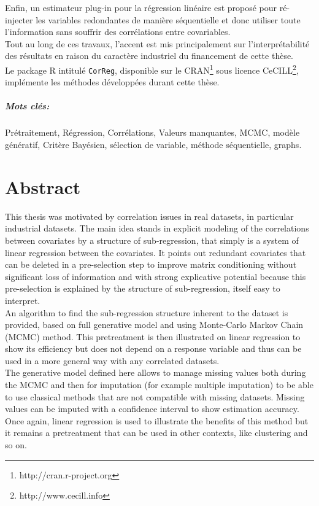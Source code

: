 \documentclass[12pt,a4paper]{report}
\begin{document}
	Enfin, un estimateur plug-in pour la régression linéaire est proposé pour ré-injecter les variables redondantes de manière séquentielle et donc utiliser toute l'information sans souffrir des corrélations entre covariables.
	\\
	
	Tout au long de ces travaux, l'accent est mis principalement sur l'interprétabilité des résultats en raison du caractère industriel du financement de cette thèse. 
\\	

	Le package R intitulé {\tt CorReg}, disponible sur le CRAN\footnote{http://cran.r-project.org} sous licence CeCILL\footnote{http://www.cecill.info}, implémente les méthodes développées durant cette thèse.
	
\paragraph{Mots clés:}Prétraitement, Régression, Corrélations, Valeurs manquantes, MCMC, modèle génératif, Critère Bayésien, sélection de variable, méthode séquentielle, graphs.
\chapter*{Abstract}
	This thesis was motivated by correlation issues in real datasets, in particular industrial datasets. The main idea stands in explicit modeling of the correlations between covariates by a structure of sub-regression, that simply is a system of linear regression between the covariates. It points out redundant covariates that can be deleted in a pre-selection step to improve matrix conditioning without significant loss of information and with strong explicative potential because this pre-selection is explained by the structure of sub-regression, itself easy to interpret.
	\\
	
	An algorithm to find the sub-regression structure inherent to the dataset is provided, based on full generative model and using Monte-Carlo Markov Chain (MCMC) method. This pretreatment is then illustrated on linear regression to show its efficiency but does not depend on a response variable and thus can be used in a more general way with any correlated datasets.
	\\
	
	The generative model defined here allows to manage missing values both during the MCMC and then for imputation (for example multiple imputation) to be able to use classical methods that are not compatible with missing datasets. Missing values can be imputed with a confidence interval to show estimation accuracy. Once again, linear regression is used to illustrate the benefits of this method but it remains a pretreatment that can be used in other contexts, like clustering and so on.
	\\ 
	
\end{document}
